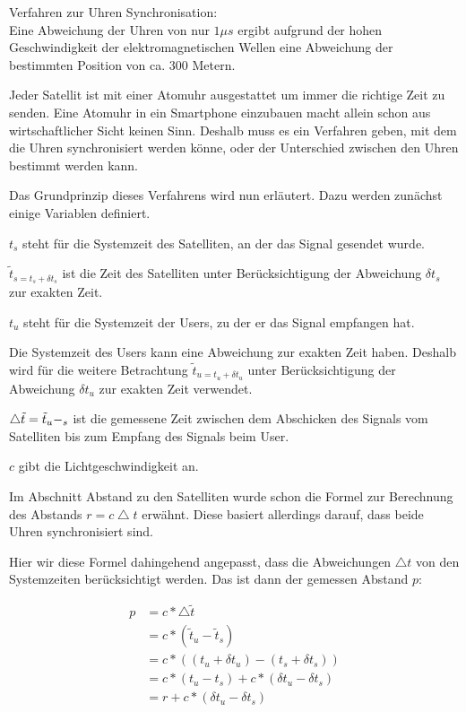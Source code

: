 Verfahren zur Uhren Synchronisation:\\
Eine Abweichung der Uhren von nur $1\mu s$ ergibt aufgrund der hohen Geschwindigkeit der elektromagnetischen Wellen eine Abweichung der bestimmten Position von ca. 300 Metern.
\cite[S. 189]{Schiller2004}

Jeder Satellit ist mit einer Atomuhr ausgestattet um immer die richtige Zeit zu senden. Eine Atomuhr in ein Smartphone einzubauen macht allein schon aus wirtschaftlicher Sicht keinen Sinn. Deshalb muss es ein Verfahren geben, mit dem die Uhren synchronisiert werden könne, oder der Unterschied zwischen den Uhren bestimmt werden kann.

Das Grundprinzip dieses Verfahrens wird nun erläutert. Dazu werden zunächst einige Variablen definiert.

$ t_{s} $ steht für die Systemzeit des Satelliten, an der das Signal gesendet wurde.

$ \tilde{t}_{s = t_{s} + \delta t_{s}} $ ist die Zeit des Satelliten unter Berücksichtigung der Abweichung $ \delta t_{s} $ zur exakten Zeit.

$ t_{u} $ steht für die Systemzeit der Users, zu der er das Signal empfangen hat.

Die Systemzeit des Users kann eine Abweichung zur exakten Zeit haben. Deshalb wird für die weitere Betrachtung $ \tilde{t}_{u = t_{u} + \delta t_{u}} $ unter Berücksichtigung der Abweichung $ \delta t_{u} $ zur exakten Zeit verwendet.

$ \bigtriangleup \tilde{t} = \tilde{t}_{u} - \title{t}_{s} $ ist die gemessene Zeit zwischen dem Abschicken des Signals vom Satelliten bis zum Empfang des Signals beim User.

$ c $ gibt die Lichtgeschwindigkeit an.

Im Abschnitt \glqq Abstand zu den Satelliten \grqq wurde schon die Formel zur Berechnung des Abstands $ r = c \bigtriangleup t $ erwähnt. Diese basiert allerdings darauf, dass beide Uhren synchronisiert sind.

Hier wir diese Formel dahingehend angepasst, dass die Abweichungen $\bigtriangleup t$ von den Systemzeiten berücksichtigt werden. Das ist dann der gemessen Abstand $p$:

\glqq 
\begin{align}
p &= c * \bigtriangleup \tilde{t} \\
  &= c * (\tilde{t}_{u} - \tilde{t}_{s}) \\
  &= c * ((t_{u} + \delta t_{u}) - (t_{s} + \delta t_{s})) \\
  &= c * (t_{u} - t_{s}) + c * (\delta t_{u} - \delta t_{s}) \\
  &= r + c * (\delta t_{u} - \delta t_{s})
\end{align}
\grqq \cite[S. 190]{Schiller2004}

